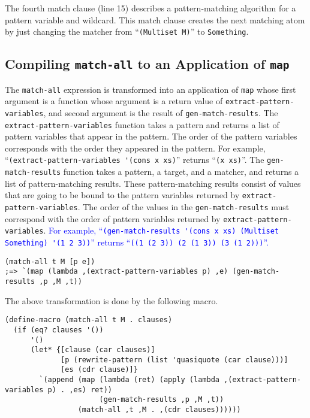 \documentclass[acmlarge]{acmart}
\newcommand{\new}[1]{\textcolor{blue}{#1}}
\begin{document}
The fourth match clause (line 15) describes a pattern-matching algorithm for a pattern variable and wildcard.
This match clause creates the next matching atom by just changing the matcher from ``\lstinline{(Multiset M)}'' to \lstinline{Something}.

\subsection{Compiling \lstinline{match-all} to an Application of \lstinline{map}}\label{method-map}

The \lstinline{match-all} expression is transformed into an application of \lstinline{map} whose first argument is a function whose argument is a return value of \lstinline{extract-pattern-variables}, and second argument is the result of \lstinline{gen-match-results}.
The \lstinline{extract-pattern-variables} function takes a pattern and returns a list of pattern variables that appear in the pattern.
The order of the pattern variables corresponds with the order they appeared in the pattern.
For example, ``\lstinline{(extract-pattern-variables '(cons x xs)}'' returns ``\lstinline{(x xs)}''.
The \lstinline{gen-match-results} function takes a pattern, a target, and a matcher, and returns a list of pattern-matching results.
These pattern-matching results consist of values that are going to be bound to the pattern variables returned by \lstinline{extract-pattern-variables}.
The order of the values in the \lstinline{gen-match-results} must correspond with the order of pattern variables returned by \lstinline{extract-pattern-variables}.
\new{
For example, ``\lstinline{(gen-match-results '(cons x xs) (Multiset Something) '(1 2 3))}'' returns ``\lstinline{((1 (2 3)) (2 (1 3)) (3 (1 2)))}''.
}%

\begin{lstlisting}[language=egison]
(match-all t M [p e])
;=> `(map (lambda ,(extract-pattern-variables p) ,e) (gen-match-results ,p ,M ,t))
\end{lstlisting}

\noindent The above transformation is done by the following macro.

\begin{lstlisting}[language=egison]
(define-macro (match-all t M . clauses)
  (if (eq? clauses '())
      '()
      (let* {[clause (car clauses)]
             [p (rewrite-pattern (list 'quasiquote (car clause)))]
             [es (cdr clause)]}
        `(append (map (lambda (ret) (apply (lambda ,(extract-pattern-variables p) . ,es) ret))
                      (gen-match-results ,p ,M ,t))
                 (match-all ,t ,M . ,(cdr clauses))))))
\end{lstlisting}
\end{document}
